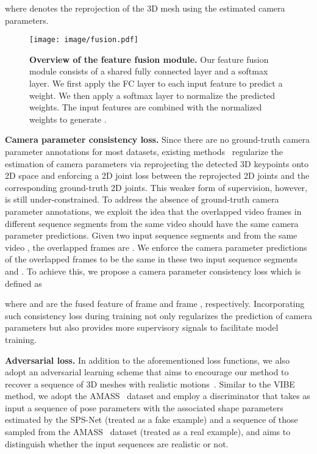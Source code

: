 \documentclass[times,referee,twocolumn,final,authoryear]{elsarticle}
\newcommand{\heading}[1]{\noindent\textbf{#1}}
\begin{document}
where  denotes the reprojection of the 3D mesh using the estimated camera parameters.

\begin{figure}[t]
  \begin{center}
    \texttt{[image: image/fusion.pdf]}
  \end{center}
  \vspace{-5.0mm}
  \caption{
\textbf{Overview of the feature fusion module.}
Our feature fusion module consists of a shared fully connected  layer and a softmax layer.
We first apply the FC layer to each input feature to predict a weight.
We then apply a softmax layer to normalize the predicted weights.
The input features are combined with the normalized weights to generate .
  }
  \label{fig:fusion}
  \vspace{-5.0mm}  
\end{figure}

\heading{Camera parameter consistency loss.}
Since there are no ground-truth camera parameter annotations for most datasets, existing methods~\citep{VIBE,HMR,SPIN} regularize the estimation of camera parameters via reprojecting the detected 3D keypoints onto 2D space and enforcing a 2D joint loss  between the reprojected 2D joints and the corresponding ground-truth 2D joints.
This weaker form of supervision, however, is still under-constrained.
To address the absence of ground-truth camera parameter annotations, we exploit the idea that the overlapped video frames in different sequence segments from the same video should have the same camera parameter predictions.
Given two input sequence segments  and  from the same video , the overlapped frames are .
We enforce the camera parameter predictions of the overlapped frames  to be the same in these two input sequence segments  and .
To achieve this, we propose a camera parameter consistency loss  which is defined as
\vspace{-2.0mm} 

where  and  are the fused feature of frame  and frame , respectively.
Incorporating such consistency loss during training not only regularizes the prediction of camera parameters but also provides more supervisory signals to facilitate model training.

\heading{Adversarial loss.} 
In addition to the aforementioned loss functions, we also adopt an adversarial learning scheme that aims to encourage our method to recover a sequence of 3D meshes with realistic motions~\citep{VIBE}.
Similar to the VIBE~\citep{VIBE} method, we adopt the AMASS~\citep{AMASS} dataset and employ a discriminator  that takes as input a sequence of pose parameters with the associated shape parameters  estimated by the SPS-Net (treated as a fake example) and a sequence of those  sampled from the AMASS~\citep{AMASS} dataset (treated as a real example), and aims to distinguish whether the input sequences are realistic or not.
\end{document}

